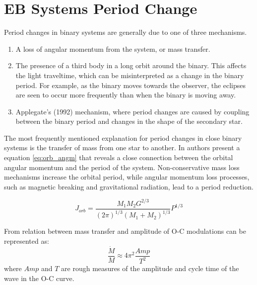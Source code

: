 \section{EB Systems Period Change}
\label{ch:EB_p}
Period changes in binary systems are generally due to one of three
mechanisms.
\begin{enumerate}[label=(\roman*)]
\item A loss of angular momentum from the system, or mass transfer.

\item The presence of a third body in a long orbit around the binary.
This affects the light traveltime, which can be misinterpreted as
a change in the binary period. For example, as the binary moves
towards the observer, the eclipses are seen to occur more frequently
than when the binary is moving away.

\item Applegate’s (1992) mechanism, where period changes are
caused by coupling between the binary period and changes in the
shape of the secondary star.
\end{enumerate}

The most frequently mentioned explanation for period changes
in close binary systems is the transfer of mass from one star to another.
In \cite{Nanouris2011} authors present a equation \ref{eq:orb_angm} that reveals a close connection between the orbital angular momentum and the period of the system. Non-conservative
mass loss mechanisms increase the orbital period, while angular momentum loss processes, such as magnetic breaking and gravitational
radiation, lead to a period reduction.

\begin{equation}
\label{eq:orb_angm}
J_{orb} = \frac{M_1 M_2 G^{2/3}}{(2\pi)^{1/3}(M_1+M_2)^{1/3}}P^{1/3}
\end{equation}

From \cite{Tran2013} relation between mass transfer and amplitude of O-C modulations can be represented as:
\begin{equation}
\frac{\dot{M}}{M} \approx 4\pi^2 \frac{Amp}{T^2} 
\end{equation}
where $Amp$ and $T$ are rough measures of the amplitude and cycle time of the wave in the O-C curve.

